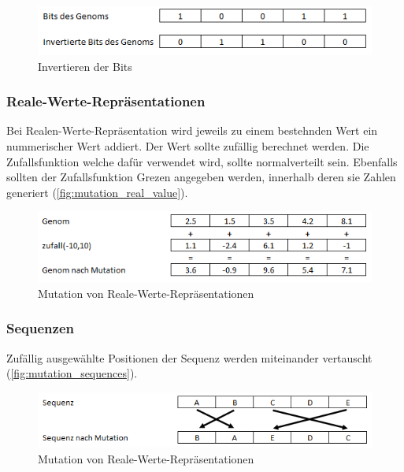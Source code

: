         \begin{figure}[H]
          \includegraphics[scale=1, center]{graphics/mutation_binary_flip}
          \caption{Invertieren der Bits \label{fig:mutation_binary_flip}}
        \end{figure}

      \subsubsection{Reale-Werte-Repräsentationen}

        Bei Realen-Werte-Repräsentation wird jeweils zu einem bestehnden Wert ein nummerischer Wert addiert.
        Der Wert sollte zufällig berechnet werden. Die Zufallsfunktion welche dafür verwendet wird, sollte normalverteilt sein.
        Ebenfalls sollten der Zufallsfunktion Grezen angegeben werden, innerhalb deren sie Zahlen generiert (\vref{fig:mutation_real_value}).

        \begin{figure}[H]
          \includegraphics[scale=1, center]{graphics/mutation_real_value}
          \caption{Mutation von Reale-Werte-Repräsentationen \label{fig:mutation_real_value}}
        \end{figure}

      \subsubsection{Sequenzen}

        Zufällig ausgewählte Positionen der Sequenz werden miteinander vertauscht (\vref{fig:mutation_sequences}).

        \begin{figure}[H]
            \includegraphics[scale=1, center]{graphics/mutation_sequences}
            \caption{Mutation von Reale-Werte-Repräsentationen \label{fig:mutation_sequences}}
        \end{figure}

